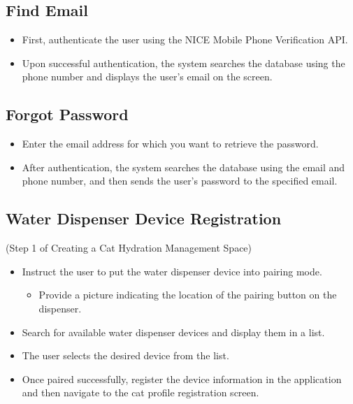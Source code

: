 \documentclass[conference]{IEEEtran}
\begin{document}
\subsection{Find Email}
\begin{itemize}
\item First, authenticate the user using the NICE Mobile Phone Verification API.
\item Upon successful authentication, the system searches the database using the phone number and displays the user's email on the screen.\\
\end{itemize}

\subsection{Forgot Password}
\begin{itemize}
\item Enter the email address for which you want to retrieve the password.
\item After authentication, the system searches the database using the email and phone number, and then sends the user's password to the specified email.\\
\end{itemize} 

\subsection{Water Dispenser Device Registration}
(Step 1 of Creating a Cat Hydration Management Space)
\begin{itemize}
\item Instruct the user to put the water dispenser device into pairing mode.
    \begin{itemize}
        \item Provide a picture indicating the location of the pairing button on the dispenser.
    \end{itemize}
\item Search for available water dispenser devices and display them in a list.
\item The user selects the desired device from the list.
\item Once paired successfully, register the device information in the application and then navigate to the cat profile registration screen.\\
\end{itemize}
\end{document}
